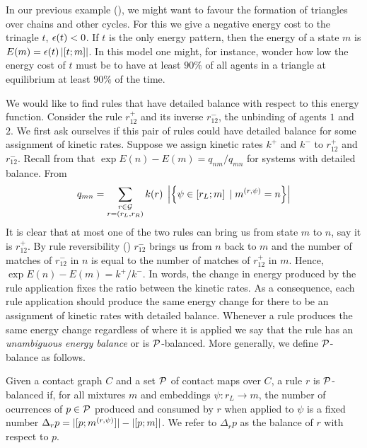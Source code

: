 In our previous example (),
we might want to favour the formation of
triangles over chains and other cycles.
For this we give a negative energy cost to the trinagle $t$,
\ie $\epsilon(t) < 0$.
If $t$ is the only energy pattern,
then the energy of a state $m$ is
$E(m) = \epsilon(t) \left\lvert \left[t;m\right] \right\rvert$.
In this model one might, for instance,
wonder how low the energy cost of $t$ must be
to have at least $90\%$ of all agents in a triangle
at equilibrium at least $90\%$ of the time.

We would like to find rules that have detailed balance
with respect to this energy function.
Consider the rule $r^+_{12}$ and its inverse $r^-_{12}$,
the unbinding of agents $1$ and $2$.
We first ask ourselves if this pair of rules
could have detailed balance
for some assignment of kinetic rates.
Suppose we assign kinetic rates $k^+$ and $k^-$
to $r^+_{12}$ and $r^-_{12}$.
Recall from  that $\exp{E(n)-E(m)} = q_{nm}/q_{mn}$
for systems with detailed balance.
From 
\[ q_{mn} = \sum_{\substack{r \in \mathcal{G}\\r = \left(r_L,r_R\right)}}
   k(r) \; \left\lvert \left\{ \psi \in \left[r_L;m\right] \; | \; m^{(r,\psi)} = n \right\} \right\rvert
\]
It is clear that at most one of the two rules
can bring us from state $m$ to $n$, say it is $r^+_{12}$.
By rule reversibility ()
$r^-_{12}$ brings us from $n$ back to $m$
and the number of matches of $r^-_{12}$ in $n$
is equal to the number of matches of $r^+_{12}$ in $m$.
Hence, $\exp{E(n)-E(m)} = k^+/k^-$.
In words, the change in energy produced by the rule application
fixes the ratio between the kinetic rates.
As a consequence,
each rule application should produce the same energy change
for there to be an assignment of kinetic rates with detailed balance.
Whenever a rule produces the same energy change
regardless of where it is applied
we say that the rule has an \emph{unambiguous energy balance}
or is $\mathcal{P}$-balanced.
More generally, we define $\mathcal{P}$-balance as follows.

\begin{definition}
  Given a contact graph $C$
  and a set $\mathcal{P}$ of contact maps over $C$,
  a rule $r$ is $\mathcal{P}$-balanced
  if, for all mixtures $m$ and embeddings $\psi: r_L \to m$,
  the number of ocurrences of $p \in \mathcal{P}$
  produced and consumed by $r$ when applied to $\psi$
  is a fixed number
  $\Delta_r p = |[p;m^{(r,\psi)}]| - \left\lvert \left[p;m\right] \right\rvert$.
  We refer to $\Delta_r p$ as the balance of $r$ with respect to $p$.
\end{definition}


